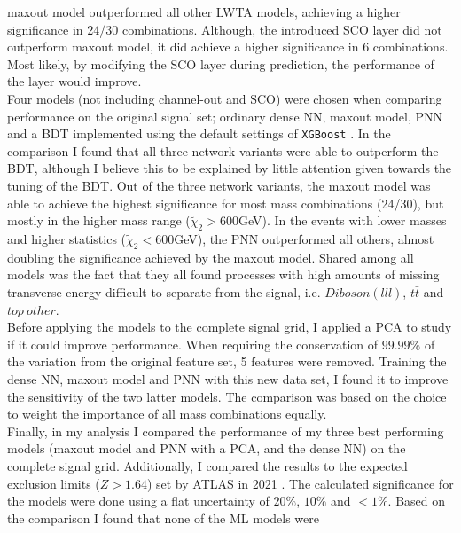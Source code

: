 maxout model outperformed all other \ac{LWTA} models, achieving a higher significance in 24/30 combinations. Although, the introduced \ac{SCO} layer did not outperform maxout model, it did achieve a higher significance in 6 
combinations. Most likely, by modifying the \ac{SCO} layer during prediction, the performance of the layer would improve.
\\\newline
Four models (not including channel-out and \ac{SCO}) were chosen when comparing performance on the original signal set; ordinary dense \ac{NN}, maxout model, \ac{PNN} and a \ac{BDT} implemented using the default settings of \verb!XGBoost! \cite{XGB}. In the comparison I found that 
all three network variants were able to outperform the \ac{BDT}, although I believe this to be explained by little attention given towards the tuning of the \ac{BDT}. Out of the three network variants, the maxout model was able to achieve 
the highest significance for most mass combinations (24/30), but mostly in the higher mass range ($\tilde{\chi}_2>600$GeV). In the events with lower masses and higher statistics ($\tilde{\chi}_2<600$GeV), the \ac{PNN} outperformed all others, 
almost doubling the significance achieved by the maxout model. Shared among all models was the fact that they all found processes with high amounts of missing transverse energy difficult to separate from the signal, i.e. $Diboson(lll)$, $t\bar{t}$ and $top\ other$.
\\\newline
Before applying the models to the complete signal grid, I applied a \ac{PCA} to study if it could improve performance. When requiring the conservation of $99.99\%$ of the variation from the original feature set, 5 features were removed.
Training the dense \ac{NN}, maxout model and \ac{PNN} with this new data set, I found it to improve the sensitivity of the two latter models. The comparison was based on the choice to weight the importance of all mass combinations equally.
\\\newline
Finally, in my analysis I compared the performance of my three best performing models (maxout model and \ac{PNN} with a \ac{PCA}, and the dense \ac{NN}) on the complete signal grid. Additionally, I compared the results to the expected exclusion 
limits ($Z>1.64$) set by \ac{ATLAS} in 2021 \cite{atlas_search_2021}. The calculated significance for the models were done using a flat uncertainty of $20\%$, $10\%$ and $<1\%$. Based on the comparison I found that none of the \ac{ML} models were 

